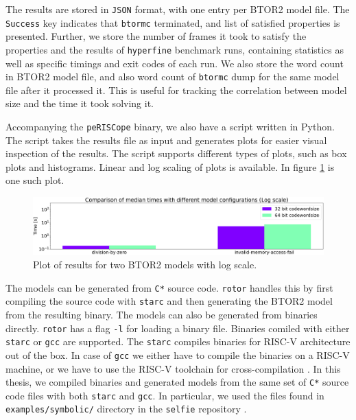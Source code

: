\documentclass[12pt]{article}
\begin{document}
The results are stored in \texttt{JSON} format, with one entry per BTOR2 model
file. The \texttt{Success} key indicates that \texttt{btormc} terminated, and
list of satisfied properties is presented. Further, we store the number of
frames it took to satisfy the properties and the results of \texttt{hyperfine}
benchmark runs, containing statistics as well as specific timings and exit
codes of each run. We also store the word count in BTOR2 model file, and also
word count of \texttt{btormc} dump for the same model file after it processed
it. This is useful for tracking the correlation between model size and the time
it took solving it.

Accompanying the \texttt{peRISCope} binary, we also have a script written in
Python. The script takes the results file as input and generates plots for
easier visual inspection of the results. The script supports different types of
plots, such as box plots and histograms. Linear and log scaling of plots is
available. In figure \ref{fig:results_plot} is one such plot.

\begin{figure}
    \includegraphics[width=\linewidth]{assets/plot_example.png}
    \centering
    \caption{
        Plot of results for two BTOR2 models with log scale.
    }
    \label{fig:results_plot}
\end{figure}

The models can be generated from \texttt{C*} source code. \texttt{rotor}
handles this by first compiling the source code with \texttt{starc} and then
generating the BTOR2 model from the resulting binary. The models can also be
generated from binaries directly. \texttt{rotor} has a flag \texttt{-l} for
loading a binary file. Binaries comiled with either \texttt{starc} or
\texttt{gcc} are supported. The \texttt{starc} compiles binaries for RISC-V
architecture out of the box. In case of \texttt{gcc} we either have to compile
the binaries on a RISC-V machine, or we have to use the RISC-V toolchain for
cross-compilation \cite{riscv_gnu}. In this thesis, we compiled binaries and
generated models from the same set of \texttt{C*} source code files with both
\texttt{starc} and \texttt{gcc}. In particular, we used the files found in
\texttt{examples/symbolic/} directory in the \texttt{selfie} repository
\cite{gh:rotor}.
\end{document}

